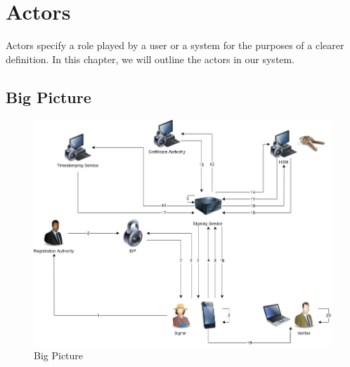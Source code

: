 \chapter{Actors}
\label{ch:actors}

Actors specify a role played by a user or a system for the purposes of a clearer definition.
In this chapter, we will outline the actors in our system.

\begin{landscape}
	\section{Big Picture}
	\begin{figure}[H]
		\begin{center}
			\includegraphics[scale=0.6]{images/BigPicture.png}
			\caption{Big Picture}
			\label{fig:bigpicture}
		\end{center}
	\end{figure}
\end{landscape}

